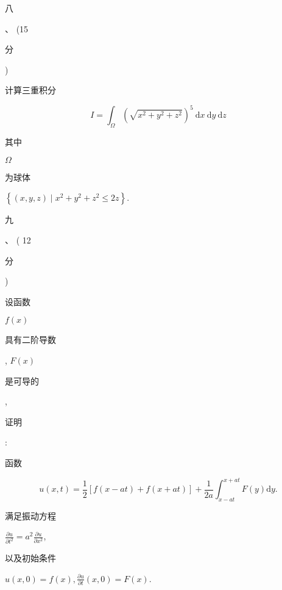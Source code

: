 \documentclass[10pt]{article}
\begin{document}
\begin{CJK}{UTF8}{mj}八\end{CJK}、 (15 \begin{CJK}{UTF8}{mj}分\end{CJK}) \begin{CJK}{UTF8}{mj}计算三重积分\end{CJK}
$$
I=\int_{\Omega}\left(\sqrt{x^{2}+y^{2}+z^{2}}\right)^{5} \mathrm{~d} x \mathrm{~d} y \mathrm{~d} z
$$
\begin{CJK}{UTF8}{mj}其中\end{CJK} $\Omega$ \begin{CJK}{UTF8}{mj}为球体\end{CJK} $\left\{(x, y, z) \mid x^{2}+y^{2}+z^{2} \leqslant 2 z\right\}$.

\begin{CJK}{UTF8}{mj}九\end{CJK}、 ( 12 \begin{CJK}{UTF8}{mj}分\end{CJK}) \begin{CJK}{UTF8}{mj}设函数\end{CJK} $f(x)$ \begin{CJK}{UTF8}{mj}具有二阶导数\end{CJK}, $F(x)$ \begin{CJK}{UTF8}{mj}是可导的\end{CJK}, \begin{CJK}{UTF8}{mj}证明\end{CJK}: \begin{CJK}{UTF8}{mj}函数\end{CJK}
$$
u(x, t)=\frac{1}{2}[f(x-a t)+f(x+a t)]+\frac{1}{2 a} \int_{x-a t}^{x+a t} F(y) \mathrm{d} y .
$$
\begin{CJK}{UTF8}{mj}满足振动方程\end{CJK} $\frac{\partial u}{\partial t^{2}}=a^{2} \frac{\partial u}{\partial x^{2}}$, \begin{CJK}{UTF8}{mj}以及初始条件\end{CJK} $u(x, 0)=f(x), \frac{\partial u}{\partial t}(x, 0)=F(x)$.
\end{document}
